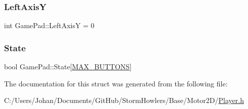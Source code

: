 \subsubsection{\texorpdfstring{LeftAxisY}{LeftAxisY}}
{\footnotesize\ttfamily int Game\+Pad\+::\+Left\+AxisY = 0}

\mbox{\label{struct_game_pad_ab80783d8ef33848055cdb3027f95305e}} 
\subsubsection{\texorpdfstring{State}{State}}
{\footnotesize\ttfamily bool Game\+Pad\+::\+State\mbox{[}\mbox{\hyperlink{_input_8h_a8bb0c7f312bb8665c3377a061dae552c}{M\+A\+X\+\_\+\+B\+U\+T\+T\+O\+NS}}\mbox{]}}



The documentation for this struct was generated from the following file\+:\begin{DoxyCompactItemize}
\item 
C\+:/\+Users/\+Johan/\+Documents/\+Git\+Hub/\+Storm\+Howlers/\+Base/\+Motor2\+D/\mbox{\hyperlink{_player_8h}{Player.\+h}}\end{DoxyCompactItemize}
